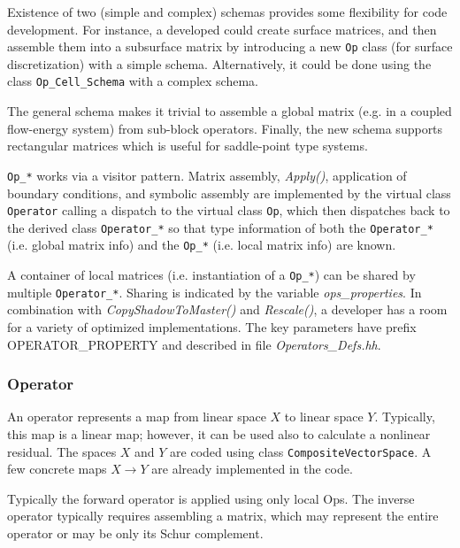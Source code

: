 Existence of two (simple and complex) schemas provides some flexibility for code development.
For instance, a developed could create surface matrices, and then assemble them into a 
subsurface matrix by introducing a new {\tt Op} class (for surface discretization) with a simple schema.
Alternatively, it could be done using the class {\tt Op\_Cell\_Schema} with a complex schema. 

The general schema makes it trivial to assemble a global matrix (e.g. in a coupled flow-energy system)
from sub-block operators.
Finally, the new schema supports rectangular matrices which is useful for saddle-point 
type systems.

{\tt Op\_*} works via a visitor pattern.
Matrix assembly, {\it Apply()}, application of boundary conditions, and symbolic assembly 
are implemented by the virtual class {\tt Operator} calling a dispatch to the 
virtual class {\tt Op}, which then dispatches back to the derived class {\tt Operator\_*} so that
type information of both the {\tt Operator\_*} (i.e. global matrix info) and 
the {\tt Op\_*} (i.e. local matrix info) are known.

A container of local matrices (i.e. instantiation of a {\tt Op\_*}) 
can be shared by multiple {\tt Operator\_*}. 
Sharing is indicated by the variable {\it ops\_properties}. 
In combination with {\it CopyShadowToMaster()} and {\it Rescale()},
a developer has a room for a variety of optimized implementations.
The key parameters have prefix {\rm OPERATOR\_PROPERTY} and described in file {\it Operators\_Defs.hh}.


\subsubsection{Operator}
An operator represents a map from linear space $X$ to linear space $Y$.
Typically, this map is a linear map; however, it can be used also to calculate
a nonlinear residual. 
The spaces $X$ and $Y$ are coded using class {\tt CompositeVectorSpace}.
A few concrete maps $X \to Y$ are already implemented in the code.

Typically the forward operator is applied using only local Ops.
The inverse operator typically requires assembling a matrix, which 
may represent the entire operator or may be only its Schur complement.

